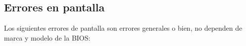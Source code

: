 \documentclass[12pt,oneside,a4paper]{article}
\begin{document}
				



				

				

				


	\subsection{Errores en pantalla}\label{sub:errores en pantalla}
	
	Los siguientes errores de pantalla son errores generales o bien, no
	dependen de marca y modelo de la BIOS:
\end{document}
